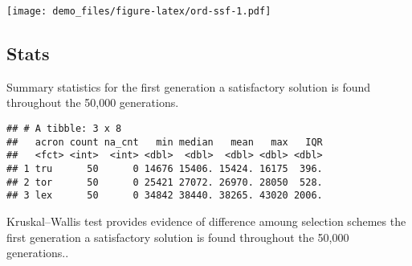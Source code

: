 \documentclass[]{book}
\newenvironment{Shaded}{\begin{snugshade}}{\end{snugshade}}
\newcommand{\DataTypeTok}[1]{\textcolor[rgb]{0.13,0.29,0.53}{#1}}
\newcommand{\KeywordTok}[1]{\textcolor[rgb]{0.13,0.29,0.53}{\textbf{#1}}}
\newcommand{\NormalTok}[1]{#1}
\newcommand{\OperatorTok}[1]{\textcolor[rgb]{0.81,0.36,0.00}{\textbf{#1}}}
\newcommand{\OtherTok}[1]{\textcolor[rgb]{0.56,0.35,0.01}{#1}}
\newcommand{\StringTok}[1]{\textcolor[rgb]{0.31,0.60,0.02}{#1}}
\begin{document}
\texttt{[image: demo\_files/figure-latex/ord-ssf-1.pdf]}

\hypertarget{stats-3}{%
\subsection{Stats}\label{stats-3}}

Summary statistics for the first generation a satisfactory solution is found throughout the 50,000 generations.

\begin{Shaded}
\end{Shaded}

\begin{verbatim}
## # A tibble: 3 x 8
##   acron count na_cnt   min median   mean   max   IQR
##   <fct> <int>  <int> <dbl>  <dbl>  <dbl> <dbl> <dbl>
## 1 tru      50      0 14676 15406. 15424. 16175  396.
## 2 tor      50      0 25421 27072. 26970. 28050  528.
## 3 lex      50      0 34842 38440. 38265. 43020 2006.
\end{verbatim}

Kruskal--Wallis test provides evidence of difference amoung selection schemes the first generation a satisfactory solution is found throughout the 50,000 generations..
\end{document}
